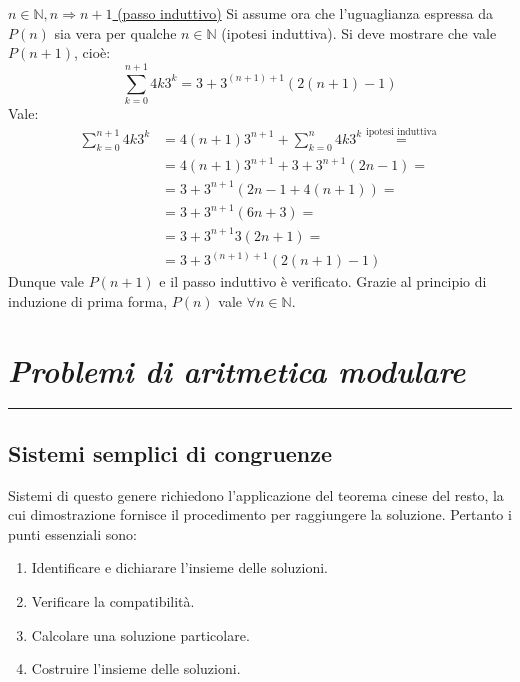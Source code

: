 \documentclass[oneside]{book}
\theoremstyle{remark}
\newcommand{\chptr}[1]{\chapter{\textit{#1}}\noindent\rule{\textwidth}{1pt}}
\begin{document}
\begin{tcolorbox}[colback=blue!30, colframe=blue!30!black]
    \underline{$n\in\mathbb{N},n\Longrightarrow n+1$ (passo induttivo)}
    Si assume ora che l'uguaglianza espressa da $P(n)$ sia vera per
    qualche $n\in\mathbb{N}$ (ipotesi induttiva). Si deve mostrare che
    vale $P(n+1)$, cioè:
    \[ \sum_{k=0}^{n+1}4k3^k=3+3^{(n+1)+1}(2(n+1)-1) \]
    Vale:
    \begin{align*}
    \sum_{k=0}^{n+1}4k3^k &=4(n+1)3^{n+1} + \sum_{k=0}^{n}4k3^k \stackrel{\text{ipotesi induttiva}}{=}\\
                            &=4(n+1)3^{n+1} + 3+3^{n+1}(2n-1) =\\
                            &=3+3^{n+1}(2n-1+4(n+1)) =\\
                            &=3+3^{n+1}(6n+3) =\\
                            &=3+3^{n+1}3(2n+1) =\\
                            &=3+3^{(n+1)+1}(2(n+1)-1)
    \end{align*}
    Dunque vale $P(n+1)$ e il passo induttivo è verificato. Grazie al
    principio di induzione di prima forma, $P(n)$ vale $\forall n\in\mathbb{N}$.
\end{tcolorbox}

\chptr{Problemi di aritmetica modulare}
\section{Sistemi semplici di congruenze}
Sistemi di questo genere richiedono l'applicazione del teorema cinese
del resto, la cui dimostrazione fornisce il procedimento per raggiungere la
soluzione. Pertanto i punti essenziali sono:
\begin{enumerate}
\item Identificare e dichiarare l'insieme delle soluzioni.
\item Verificare la compatibilità.
\item Calcolare una soluzione particolare.
\item Costruire l'insieme delle soluzioni.
\end{enumerate}
\end{document}
